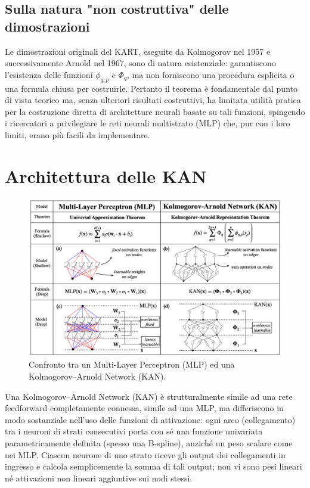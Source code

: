 \documentclass[a4paper,12pt]{report}
\begin{document}
	\subsection{Sulla natura "non costruttiva" delle dimostrazioni}
	Le dimostrazioni originali del KART, eseguite da Kolmogorov nel 1957 e successivamente Arnold nel 1967, sono di natura esistenziale: garantiscono l'esistenza delle funzioni \(\phi_{q,p}\) e \(\Phi_q\), ma non forniscono una procedura esplicita o una formula chiusa per costruirle. Pertanto il teorema è fondamentale dal punto di vista teorico ma, senza ulteriori risultati costruttivi, ha limitata utilità pratica per la costruzione diretta di architetture neurali basate su tali funzioni, spingendo i ricercatori a privilegiare le reti neurali multistrato (MLP) che, pur con i loro limiti, erano più facili da implementare.
	
	\section{Architettura delle KAN}
	
	\begin{figure}[H]
		\centering
		\includegraphics[width=1.0\textwidth]{img/KANvsMLP.png}
		\caption{Confronto tra un Multi-Layer Perceptron (MLP) ed una Kolmogorov–Arnold Network (KAN).}
	\end{figure}
	Una Kolmogorov–Arnold Network (KAN) è strutturalmente simile ad una rete feedforward completamente connessa, simile ad una MLP, ma differiscono in modo sostanziale nell'uso delle funzioni di attivazione: ogni arco (collegamento) tra i neuroni di strati consecutivi porta con sé una funzione univariata parametricamente definita (spesso una B-spline), anziché un peso scalare come nei MLP. Ciascun neurone di uno strato riceve gli output dei collegamenti in ingresso e calcola semplicemente la somma di tali output; non vi sono pesi lineari né attivazioni non lineari aggiuntive sui nodi stessi.
	
\end{document}
